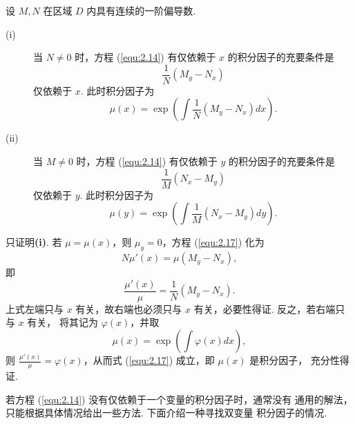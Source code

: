 \begin{thm}\label{thm:2.3.2}
设 $M,N$ 在区域 $D$ 内具有连续的一阶偏导数.
\begin{description}
\item[(i)] 当 $N\neq0$ 时，方程 (\ref{equ:2.14}) 有仅依赖于 $x$ 的积分因子的充要条件是
\[
\frac{1}{N}(M_y-N_x)
\]
仅依赖于 $x$. 此时积分因子为
\begin{equation}\label{equ:2.18}
\mu(x)=\exp\left(\int\frac{1}{N}(M_y-N_x)dx\right).
\end{equation}
\item[(ii)] 当 $M\neq0$ 时，方程 (\ref{equ:2.14}) 有仅依赖于 $y$ 的积分因子的充要条件是
\[
\frac{1}{M}(N_x-M_y)
\]
仅依赖于 $y$. 此时积分因子为
\begin{equation}\label{equ:2.19}
\mu(y)=\exp\left(\int\frac{1}{M}(N_x-M_y)dy\right).
\end{equation}
\end{description}
\end{thm}
\begin{pf1}
只证明\textbf{(i)}. 若 $\mu=\mu(x)$，则 $\mu_y=0$，方程 (\ref{equ:2.17}) 化为
\[
N\mu'(x)=\mu(M_y-N_x),
\]
即
\[
\frac{\mu'(x)}{\mu}=\frac{1}{N}(M_y-N_x).
\]
上式左端只与 $x$ 有关，故右端也必须只与 $x$ 有关，必要性得证. 反之，若右端只与 $x$ 有关，
将其记为 $\varphi(x)$，并取
\[
\mu(x)=\exp\left(\int\varphi(x)dx\right),
\]
则 $\frac{\mu'(x)}{\mu}=\varphi(x)$，从而式 (\ref{equ:2.17}) 成立，即 $\mu(x)$ 是积分因子，
充分性得证.
\end{pf1}

若方程 (\ref{equ:2.14}) 没有仅依赖于一个变量的积分因子时，通常没有
通用的解法，只能根据具体情况给出一些方法. 下面介绍一种寻找双变量
积分因子的情况.


